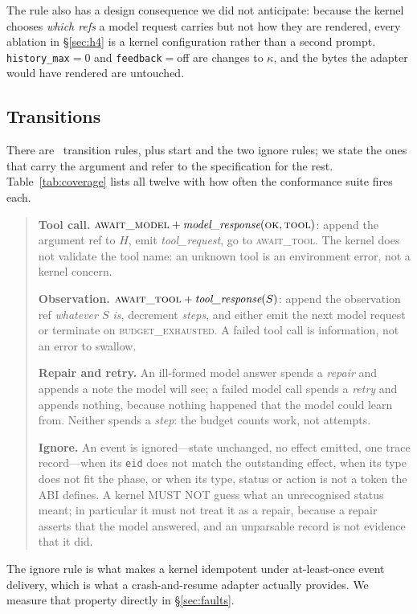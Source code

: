 \documentclass[11pt,a4paper]{article}
\begin{document}
The rule also has a design consequence we did not anticipate: because the
kernel chooses \emph{which refs} a model request carries but not how they are
rendered, every ablation in \S\ref{sec:h4} is a kernel configuration rather
than a second prompt. \texttt{history\_max}$=0$ and \texttt{feedback}$=$off are
changes to $\kappa$, and the bytes the adapter would have rendered are
untouched.

\subsection{Transitions}

There are \almrules\ transition rules, plus start and the two ignore rules;
we state the ones that carry the argument and refer to the specification for
the rest. Table~\ref{tab:coverage} lists all twelve with how often the
conformance suite fires each.

\begin{quote}
\textbf{Tool call.} $\textsc{await\_model} + \textit{model\_response}
(\textsc{ok}, \textsc{tool})$: append the argument ref to $H$, emit
\textit{tool\_request}, go to \textsc{await\_tool}. The kernel does not validate
the tool name: an unknown tool is an environment error, not a kernel concern.

\textbf{Observation.} $\textsc{await\_tool} + \textit{tool\_response}(S)$:
append the observation ref \emph{whatever $S$ is}, decrement \textit{steps},
and either emit the next model request or terminate on
\textsc{budget\_exhausted}. A failed tool call is information, not an error to
swallow.

\textbf{Repair and retry.} An ill-formed model answer spends a \textit{repair}
and appends a note the model will see; a failed model call spends a
\textit{retry} and appends nothing, because nothing happened that the model
could learn from. Neither spends a \textit{step}: the budget counts work, not
attempts.

\textbf{Ignore.} An event is ignored---state unchanged, no effect emitted, one
trace record---when its \texttt{eid} does not match the outstanding effect, when
its type does not fit the phase, or when its type, status or action is not a
token the ABI defines. A kernel MUST NOT guess what an unrecognised status
meant; in particular it must not treat it as a repair, because a repair asserts
that the model answered, and an unparsable record is not evidence that it did.
\end{quote}

The ignore rule is what makes a kernel idempotent under at-least-once event
delivery, which is what a crash-and-resume adapter actually provides. We
measure that property directly in \S\ref{sec:faults}.
\end{document}
